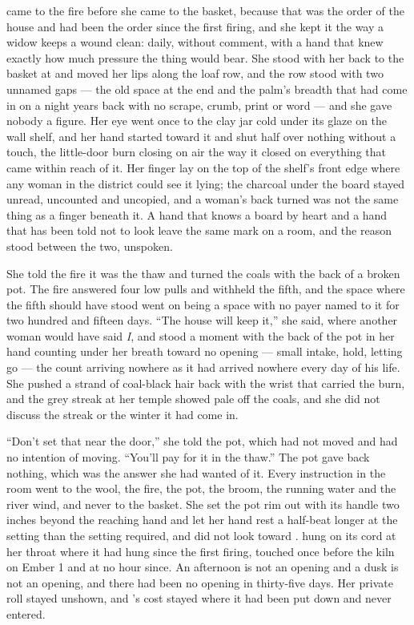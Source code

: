  came to the fire before she came to the basket, because that was the order of the house and had been the order since the first firing, and she kept it the way a widow keeps a wound clean: daily, without comment, with a hand that knew exactly how much pressure the thing would bear. She stood with her back to the basket at  and moved her lips along the loaf row, and the row stood with two unnamed gaps --- the old space at the end and the palm's breadth that had come in on a night years back with no scrape, crumb, print or word --- and she gave nobody a figure. Her eye went once to the clay jar cold under its glaze on the wall shelf, and her hand started toward it and shut half over nothing without a touch, the little-door burn closing on air the way it closed on everything that came within reach of it. Her finger lay on the top of the shelf's front edge where any woman in the district could see it lying; the charcoal under the board stayed unread, uncounted and uncopied, and a woman's back turned was not the same thing as a finger beneath it. A hand that knows a board by heart and a hand that has been told not to look leave the same mark on a room, and the reason stood between the two, unspoken.

She told the fire it was the thaw and turned the coals with the back of a broken pot. The fire answered four low pulls and withheld the fifth, and the space where the fifth should have stood went on being a space with no payer named to it for two hundred and fifteen days. “The house will keep it,” she said, where another woman would have said \emph{I}, and stood a moment with the back of the pot in her hand counting under her breath toward no opening --- small intake, hold, letting go --- the count arriving nowhere as it had arrived nowhere every day of his life. She pushed a strand of coal-black hair back with the wrist that carried the burn, and the grey streak at her temple showed pale off the coals, and she did not discuss the streak or the winter it had come in.

“Don't set that near the door,” she told the pot, which had not moved and had no intention of moving. “You'll pay for it in the thaw.” The pot gave back nothing, which was the answer she had wanted of it. Every instruction in the room went to the wool, the fire, the pot, the broom, the running water and the river wind, and never to the basket. She set the pot rim out with its handle two inches beyond the reaching hand and let her hand rest a half-beat longer at the setting than the setting required, and did not look toward .  hung on its cord at her throat where it had hung since the first firing, touched once before the kiln on Ember 1 and at no hour since. An afternoon is not an opening and a dusk is not an opening, and there had been no opening in thirty-five days. Her private roll stayed unshown, and 's cost stayed where it had been put down and never entered.

